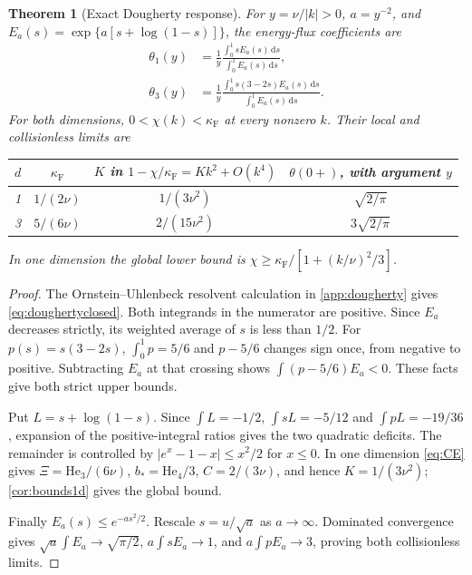 \documentclass[11pt]{article}
\newcommand{\dd}{\,\mathrm d}
\newcommand{\F}{\kappa_{\mathrm F}}
\newcommand{\He}{\mathrm{He}}
\newtheorem{theorem}{Theorem}[section]
\theoremstyle{definition}
\theoremstyle{remark}
\numberwithin{equation}{section}
\begin{document}
\begin{theorem}[Exact Dougherty response]\label{thm:dougherty}
For $y=\nu/|k|>0$, $a=y^{-2}$, and
$E_a(s)=\exp\{a[s+\log(1-s)]\}$, the energy-flux coefficients are
\begin{align}
 \theta_1(y)&=\frac1y
      \frac{\int_0^1sE_a(s)\dd s}{\int_0^1E_a(s)\dd s},\nonumber\\
 \theta_3(y)&=\frac1y
      \frac{\int_0^1s(3-2s)E_a(s)\dd s}{\int_0^1E_a(s)\dd s}.
 \label{eq:doughertyclosed}
\end{align}
For both dimensions, $0<\chi(k)<\F$ at every nonzero $k$.
Their local and collisionless limits are
\begin{center}
\begin{tabular}{cccc}
\toprule
$d$ & $\F$ & $K$ in $1-\chi/\F=Kk^2+O(k^4)$
    & $\theta(0+)$, with argument $y$\\
\midrule
1 & $1/(2\nu)$ & $1/(3\nu^2)$ & $\sqrt{2/\pi}$\\
3 & $5/(6\nu)$ & $2/(15\nu^2)$ & $3\sqrt{2/\pi}$\\
\bottomrule
\end{tabular}
\end{center}
In one dimension the global lower bound is
$\chi\geq\F/[1+(k/\nu)^2/3]$.
\end{theorem}

\begin{proof}
The Ornstein--Uhlenbeck resolvent calculation in \cref{app:dougherty}
gives \eqref{eq:doughertyclosed}. Both integrands in the numerator are
positive. Since $E_a$ decreases strictly, its weighted average of $s$
is less than $1/2$. For $p(s)=s(3-2s)$,
$\int_0^1p=5/6$ and $p-5/6$ changes sign once, from negative to positive.
Subtracting $E_a$ at that crossing shows
$\int(p-5/6)E_a<0$. These facts give both strict upper bounds.

Put $L=s+\log(1-s)$. Since
$\int L=-1/2$, $\int sL=-5/12$ and $\int pL=-19/36$,
expansion of the positive-integral ratios gives the two quadratic deficits.
The remainder is controlled by $|e^x-1-x|\leq x^2/2$ for $x\leq0$.
In one dimension \eqref{eq:CE} gives $\Xi=\He_3/(6\nu)$,
$b_*=\He_4/3$, $C=2/(3\nu)$, and hence $K=1/(3\nu^2)$;
\cref{cor:bounds1d} gives the global bound.

Finally $E_a(s)\leq e^{-as^2/2}$. Rescale $s=u/\sqrt a$
as $a\to\infty$. Dominated convergence gives
$\sqrt a\int E_a\to\sqrt{\pi/2}$,
$a\int sE_a\to1$, and $a\int pE_a\to3$, proving both
collisionless limits.
\end{proof}
\end{document}

